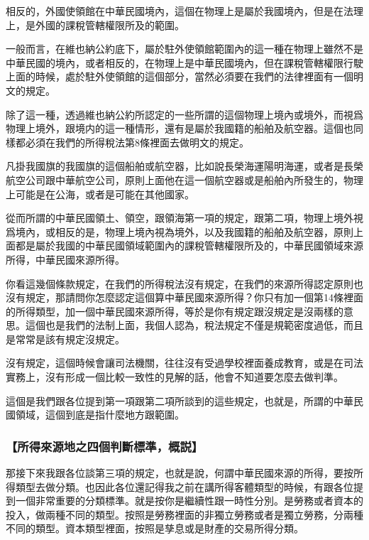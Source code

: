 \documentclass[oneside,sub3section]{ctexbook}
\begin{document}
相反的，外國使領館在中華民國境內，這個在物理上是屬於我國境內，但是在法理上，是外國的課稅管轄權限所及的範圍。

一般而言，在維也納公約底下，屬於駐外使領館範圍內的這一種在物理上雖然不是中華民國的境內，或者相反的，在物理上是中華民國境內，但在課稅管轄權限行駛上面的時候，處於駐外使領館的這個部分，當然必須要在我們的法律裡面有一個明文的規定。

除了這一種，透過維也納公約所認定的一些所謂的這個物理上境內或境外，而視爲物理上境外，跟境内的這一種情形，還有是屬於我國籍的船舶及航空器。這個也同樣都必須在我們的所得稅法第8條裡面去做明文的規定。

凡掛我國旗的我國旗的這個船舶或航空器，比如說長榮海運陽明海運，或者是長榮航空公司跟中華航空公司，原則上面他在這一個航空器或是船舶內所發生的，物理上可能是在公海，或者是可能在其他國家。

從而所謂的中華民國領土、領空，跟領海第一項的規定，跟第二項，物理上境外視爲境內，或相反的是，物理上境內視為境外，以及我國籍的船舶及航空器，原則上面都是屬於我國的中華民國領域範圍內的課稅管轄權限所及的，中華民國領域來源所得，中華民國來源所得。

你看這幾個條款規定，在我們的所得稅法沒有規定，在我們的來源所得認定原則也沒有規定，那請問你怎麼認定這個算中華民國來源所得？你只有加一個第14條裡面的所得類型，加一個中華民國來源所得，等於是你有規定跟沒規定是沒兩樣的意思。這個也是我們的法制上面，我個人認為，稅法規定不僅是規範密度過低，而且是常常是該有規定沒規定。

沒有規定，這個時候會讓司法機關，往往沒有受過學校裡面養成教育，或是在司法實務上，沒有形成一個比較一致性的見解的話，他會不知道要怎麼去做判準。

這個是我們跟各位提到第一項跟第二項所談到的這些規定，也就是，所謂的中華民國領域，這個到底是指什麼地方跟範圍。

\hypertarget{ux6240ux5f97ux4f86ux6e90ux5730ux4e4bux56dbux500bux5224ux65b7ux6a19ux6e96ux6982ux8aac}{%
\subsubsection{【所得來源地之四個判斷標準，概説】}\label{ux6240ux5f97ux4f86ux6e90ux5730ux4e4bux56dbux500bux5224ux65b7ux6a19ux6e96ux6982ux8aac}}

那接下來我跟各位談第三項的規定，也就是說，何謂中華民國來源的所得，要按所得類型去做分類。也因此各位還記得我之前在講所得客體類型的時候，有跟各位提到一個非常重要的分類標準。就是按你是繼續性跟一時性分別。是勞務或者資本的投入，做兩種不同的類型。按照是勞務裡面的非獨立勞務或者是獨立勞務，分兩種不同的類型。資本類型裡面，按照是孳息或是財產的交易所得分類。
\end{document}
